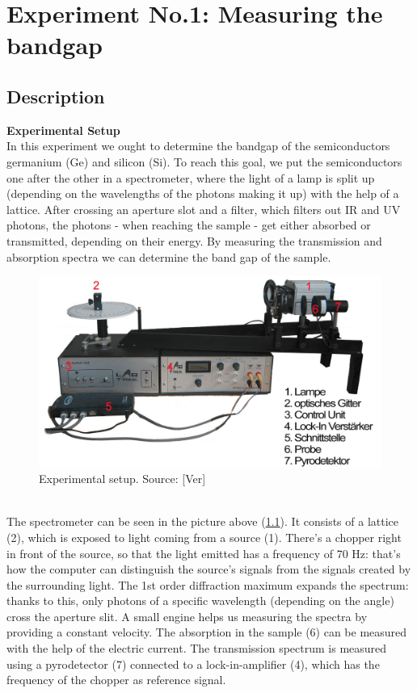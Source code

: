 \chapter{Experiment No.1: Measuring the bandgap}
\section{Description}
\textbf{Experimental Setup} \\
In this experiment we ought to determine the bandgap of the semiconductors germanium (Ge) and silicon (Si). To reach this goal, we put the semiconductors one after the other in a spectrometer, where the light of a lamp is split up (depending on the wavelengths of the photons making it up) with the help of a lattice. After crossing an aperture slot and a filter, which filters out IR and UV photons, the photons - when reaching the sample - get either absorbed or transmitted, depending on their energy. By measuring the transmission and absorption spectra we can determine the band gap of the sample. \\
\begin{figure}[h]
\begin{center}
\includegraphics[scale=0.3]{Bilder/Spektrometer.png}\caption{Experimental setup. Source: [Ver]}
\label{spektrometer}
\end{center}
\end{figure}\\
The spectrometer can be seen in the picture above (\ref{spektrometer}). It consists of a lattice (2), which is exposed to light coming from a source (1). There's a chopper right in front of the source, so that the light emitted has a frequency of 70 Hz: that's how the computer can distinguish the source's signals from the signals created by the surrounding light. The 1st order diffraction maximum expands the spectrum: thanks to this, only photons of a specific wavelength (depending on the angle) cross the aperture slit. A small engine helps us measuring the spectra by providing a constant velocity. The absorption in the sample (6) can be measured with the help of the electric current. The transmission spectrum is measured using a pyrodetector (7) connected to a lock-in-amplifier (4), which has the frequency of the chopper as reference signal. \\
